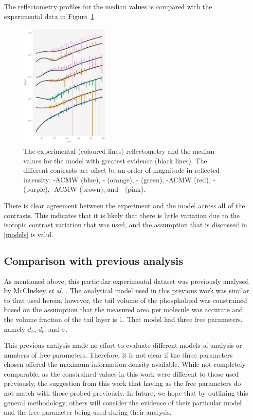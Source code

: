 \documentclass[
 reprint,
 superscriptaddress,
 amsmath,amssymb,
 aps,
]{revtex4-1}
\begin{document}
The reflectometry profiles for the median values is compared with the experimental data in Figure~\ref{fig:refl}. 
%
\begin{figure}
\includegraphics[width=0.4\textwidth]{refl}
\caption{\label{fig:refl} The experimental (coloured lines) reflectometry and the median values for the model with greatest evidence (black lines). The different contrasts are offset be an order of magnitude in reflected intensity; -ACMW (blue), - (orange), - (green), -ACMW (red), - (purple), -ACMW (brown), and - (pink).}
\end{figure}
%
There is clear agreement between the experiment and the model across all of the contrasts. 
This indicates that it is likely that there is little variation due to the isotopic contrast variation that was used, and the assumption that is discussed in \ref{models} is valid. 

\subsection{Comparison with previous analysis}

As mentioned above, this particular experimental dataset was previously analysed by McCluskey \emph{et al.} \cite{mccluskey_assessing_2019}.
The analytical model used in this previous work was similar to that used herein, however, the tail volume of the phospholipid was constrained based on the assumption that the measured area per molecule was accurate and the volume fraction of the tail layer is \num{1}. 
That model had three free parameters, namely $d_h$, $d_t$, and $\sigma$. 

This previous analysis made no effort to evaluate different models of analysis or numbers of free parameters. 
Therefore, it is not clear if the three parameters chosen offered the maximum information density available. 
While not completely comparable, as the constrained values in this work were different to those used previously, the suggestion from this work that having \unskip\;as the free parameters do not match with those probed previously.
In future, we hope that by outlining this general methodology, others will consider the evidence of their particular model and the free parameter being used during their analysis.
\end{document}
